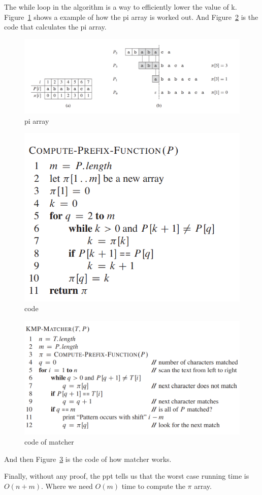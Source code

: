 \documentclass[a4paper, 10pt]{ctexart} %
\begin{document}
The while loop in the algorithm is 
a way to efficiently lower the 
value of k.  Figure~\ref{fig:sm2} shows a
example of how the 
pi array is worked out. And Figure~\ref{fig:sm3} 
is the code that calculates the 
pi array.
\begin{figure}[]
    \centering
    \includegraphics[scale  = 0.4]{sm2.png}
    \caption{pi array}
    \label{fig:sm2}
\end{figure}
\begin{figure}[]
    \centering
    \includegraphics[scale = 0.5]{sm3.png}
    \caption{code}
    \label{fig:sm3}
\end{figure}
\begin{figure}[]
    \centering
    \includegraphics[scale = 0.5]{sm4.png}
    \caption{code of matcher}
    \label{fig:sm4}
\end{figure}

And then Figure~\ref{fig:sm4} is the code of 
how matcher works. 

Finally, without any proof, the ppt 
tells us that 
the worst case running time is 
$O\left( n  +m\right)$. 
Where we need $O\left(m\right)$ time to 
compute the $\pi$ array. 
\end{document}
